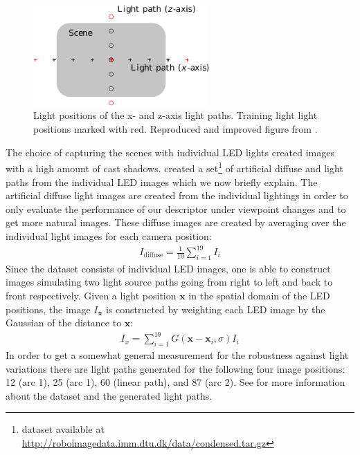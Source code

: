 \documentclass[thesis.tex]{subfiles}
\begin{document}
\begin{figure}[tb]
	\centering
	\includegraphics[width=0.6\textwidth]{img/dtu_light_overview.pdf}
	\caption{Light positions of the x- and z-axis light paths. Training light light positions marked with red. Reproduced and improved figure from \citet[Fig. 1, pp. 644]{larsen2012in}.}
	\label{fig:dtu_light_overview}
\end{figure}
%
The choice of capturing the scenes with individual LED lights created images with a high amount of cast shadows. \citet{larsen2012jet} created a set\footnote{dataset available at \url{http://roboimagedata.imm.dtu.dk/data/condensed.tar.gz}} of artificial diffuse and light paths from the individual LED images which we now briefly explain. The artificial diffuse light images are created from the individual lightings in order to only evaluate the performance of our descriptor under viewpoint changes and to get more natural images. These diffuse images are created by averaging over the individual light images for each camera position:
\begin{align}
	I_{\text{diffuse}} = \frac{1}{19} \sum_{i = 1}^{19} I_{i}
\end{align}
Since the dataset consists of individual LED images, one is able to construct images simulating two light source paths going from right to left and back to front respectively.
Given a light position ${\boldsymbol{x}}$ in the spatial domain of the LED positions, the image $I_{\boldsymbol{x}}$ is constructed by weighting each LED image by the Gaussian of the distance to ${\boldsymbol{x}}$:
\begin{align}
	I_{x} = \sum_{i = 1}^{19} G(\boldsymbol{x} - \boldsymbol{x}_i,\sigma) I_{i}
\end{align}
In order to get a somewhat general measurement for the robustness against light variations there are light paths generated for the following four image positions: 12 (arc 1), 25 (arc 1), 60 (linear path), and 87 (arc 2).
See \citet{aanaes2010recall,aanaes2010ground} for more information about the dataset and the generated light paths.
\end{document}
